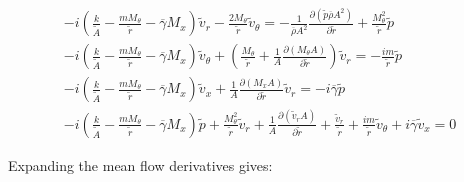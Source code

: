 \documentclass[12pt]{article}
\begin{document}
\begin{small}
\begin{eqnarray}
-i
\left(
 \frac{k}{ \widetilde{A}}
- \frac{ m M_{\theta} }{\widetilde{r}}
- \overline{\gamma} M_x  
\right) \widetilde{v}_r 
-\frac{2 M_{\theta}}{\widetilde{r}} \widetilde{v}_{\theta} 
 = 
-\frac{1}{\overline{\rho} A^2} 
\frac{\partial \left(\widetilde{p} \overline{\rho} A^2 \right) }{\partial \widetilde{r}} 
+
\frac{M_{\theta}^2 }{\widetilde{r}} 
\widetilde{p} 
\nonumber
\\
-i
\left(
\frac{k}{\widetilde{A}}
- \frac{ m M_{\theta} }{\widetilde{r} }
- \overline{\gamma} M_x  
\right) \widetilde{v}_{\theta} 
+
\left(
\frac{M_{\theta} }{\widetilde{r}}
+
\frac{1}{A}
\frac{\partial \left(M_{\theta} A \right)}{\partial \widetilde{r}}
\right) \widetilde{v}_r
 = 
-\frac{i m }{\widetilde{r} } \widetilde{p}
\nonumber
\\
-i
\left(
\frac{k}{\widetilde{A}}
- \frac{ m M_{\theta} }{\widetilde{r} }
- \overline{\gamma} M_x
\right) \widetilde{v}_x 
+
\frac{1}{A}
\frac{\partial \left(M_x A \right)}{\partial \widetilde{r}} 
\widetilde{v}_r
 = 
-i \overline{\gamma} \widetilde{p}
\nonumber
\\
-i
\left(
\frac{k}{\widetilde{A}}
- \frac{ m M_{\theta}}{\widetilde{r} } 
-  \overline{\gamma} M_x
\right) \widetilde{p}
+\frac{M_{\theta}^2 }{ \widetilde{r} }
\widetilde{v}_r 
+ 
\frac{1}{A}
\frac{\partial \left(\widetilde{v}_r A \right)}{\partial \widetilde{r}}
+ 
\frac{\widetilde{v}_r }{\widetilde{r}} 
+\frac{i m }{\widetilde{r}} \widetilde{v}_{\theta} 
+ i \overline{\gamma} \widetilde{v}_x 
 = 
0
\nonumber
\end{eqnarray}
\end{small}%

Expanding the mean flow derivatives gives:
\end{document}
